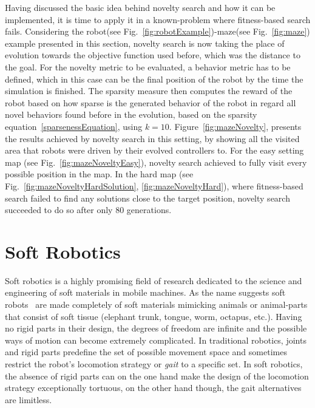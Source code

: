 Having discussed the basic idea behind novelty search and how it can be implemented, it is time to apply it in a known-problem where fitness-based search fails. Considering the robot(see Fig.~\ref{fig:robotExample})-maze(see Fig.~\ref{fig:maze}) example presented in this section, novelty search is now taking the place of evolution towards the objective function used before, which was the distance to the goal. For the novelty metric to be evaluated, a behavior metric has to be defined, which in this case can be the final position of the robot by the time the simulation is finished. The sparsity measure then computes the reward of the robot based on how sparse is the generated behavior of the robot in regard all novel behaviors found before in the evolution, based on the sparsity equation~\ref{sparsenessEquation}, using $k = 10$. Figure~\ref{fig:mazeNovelty}, presents the results achieved by novelty search in this setting, by showing all the visited area that robots were driven by their evolved controllers to. For the easy setting map (see Fig.~\ref{fig:mazeNoveltyEasy}), novelty search achieved to fully visit every possible position in the map. In the hard map (see Fig.~\ref{fig:mazeNoveltyHardSolution}, \ref{fig:mazeNoveltyHard}), where fitness-based search failed to find any solutions close to the target position, novelty search succeeded to do so after only $80$ generations.



\section{Soft Robotics}
Soft robotics is a highly promising field of research dedicated to the science and engineering of soft materials in mobile machines. As the name suggests soft robots~\citep{trivedi2008soft, pfeifer2012challenges} are made completely of soft materials mimicking animals or animal-parts that consist of soft tissue (elephant trunk, tongue, worm, octapus, etc.). Having no rigid parts in their design, the degrees of freedom are infinite and the possible ways of motion can become extremely complicated. In traditional robotics, joints and rigid parts predefine the set of possible movement space and sometimes restrict the robot's locomotion strategy or \emph{gait} to a specific set. In soft robotics, the absence of rigid parts can on the one hand make the design of the locomotion strategy exceptionally tortuous, on the other hand though, the gait alternatives are limitless.


